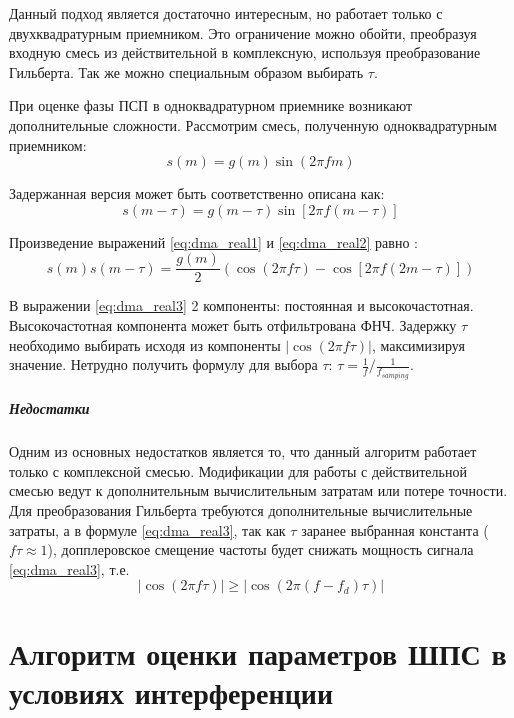 Данный подход является достаточно интересным, но работает только с двухквадратурным приемником. Это ограничение можно
обойти, преобразуя входную смесь из действительной в комплексную, используя преобразование Гильберта.
Так же можно специальным образом выбирать ${\tau}$.

При оценке фазы ПСП в одноквадратурном приемнике возникают дополнительные сложности. Рассмотрим смесь, полученную одноквадратурным приемником:
\begin{equation}
	\label{eq:dma_real1}
	s(m) = g(m) \sin{(2\pi fm)}
\end{equation}

Задержанная версия может быть соответственно описана как:
\begin{equation}
	\label{eq:dma_real2}
	s(m - \tau) = g(m - \tau) \sin{\left[2\pi f(m-\tau)\right]}
\end{equation}

Произведение выражений \ref{eq:dma_real1} и \ref{eq:dma_real2} равно \cite{tsui}:
\begin{equation}
	\label{eq:dma_real3}
	s(m)s(m - \tau) = \frac{g(m)}{2} \left(\cos (2\pi f \tau) - \cos \left[2 \pi f (2m - \tau)\right]\right)
\end{equation}

В выражении \ref{eq:dma_real3} 2 компоненты: постоянная и высокочастотная. Высокочастотная компонента
может быть отфильтрована ФНЧ. Задержку ${\tau}$ необходимо выбирать исходя из компоненты ${\left| \cos (2\pi f \tau) \right|}$,
максимизируя значение. Нетрудно получить формулу для выбора ${\tau}$: ${\tau = \frac{1}{f} / \frac{1}{f_{samping}}}$.

\subparagraph{Недостатки}
Одним из основных недостатков является то, что данный алгоритм работает только с комплексной смесью. Модификации
для работы с действительной смесью ведут к дополнительным вычислительным затратам или потере точности. Для
преобразования Гильберта требуются дополнительные вычислительные затраты, а в формуле \ref{eq:dma_real3}, так
как ${\tau}$ заранее выбранная константа (${f\tau \approx 1}$), допплеровское смещение частоты будет снижать мощность
сигнала \ref{eq:dma_real3}, т.е.
\begin{equation}
	\left| \cos (2\pi f \tau) \right| \ge \left| \cos (2\pi (f - f_d) \tau) \right|
\end{equation}

\section{Алгоритм оценки параметров ШПС в условиях интерференции}
\label{l:ssec3_dma_lpc_algo}

